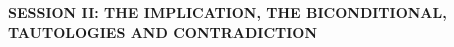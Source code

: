 %
%
%
%
    {\Large \textbf{SESSION II: THE IMPLICATION, THE BICONDITIONAL, TAUTOLOGIES AND CONTRADICTION}}\\[2mm]

